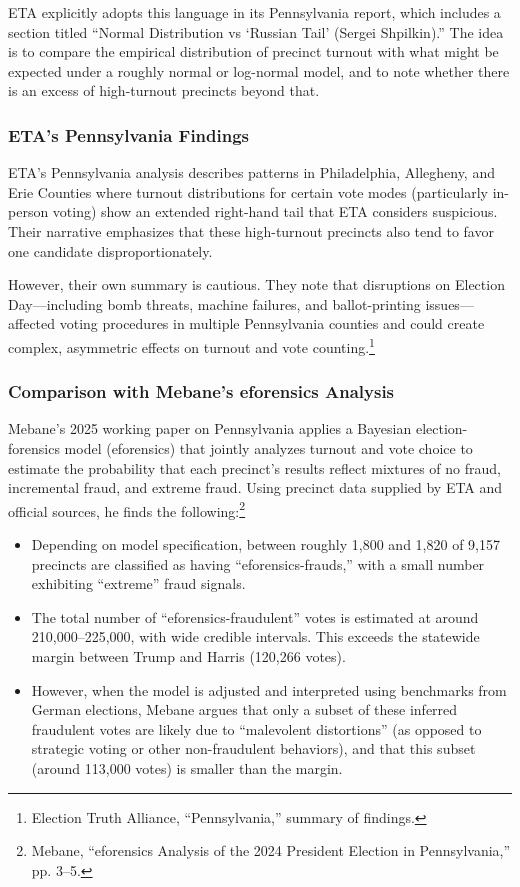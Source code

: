 \documentclass[12pt]{article}
\begin{document}
ETA explicitly adopts this language in its Pennsylvania report, which includes a section titled \enquote{Normal Distribution vs `Russian Tail' (Sergei Shpilkin).} The idea is to compare the empirical distribution of precinct turnout with what might be expected under a roughly normal or log-normal model, and to note whether there is an excess of high-turnout precincts beyond that.

\subsubsection{ETA's Pennsylvania Findings}

ETA's Pennsylvania analysis describes patterns in Philadelphia, Allegheny, and Erie Counties where turnout distributions for certain vote modes (particularly in-person voting) show an extended right-hand tail that ETA considers suspicious. Their narrative emphasizes that these high-turnout precincts also tend to favor one candidate disproportionately.

However, their own summary is cautious. They note that disruptions on Election Day---including bomb threats, machine failures, and ballot-printing issues---affected voting procedures in multiple Pennsylvania counties and could create complex, asymmetric effects on turnout and vote counting.\footnote{Election Truth Alliance, ``Pennsylvania,'' summary of findings.}

\subsubsection{Comparison with Mebane's eforensics Analysis}

Mebane's 2025 working paper on Pennsylvania applies a Bayesian election-forensics model (eforensics) that jointly analyzes turnout and vote choice to estimate the probability that each precinct's results reflect mixtures of no fraud, incremental fraud, and extreme fraud. Using precinct data supplied by ETA and official sources, he finds the following:\footnote{Mebane, ``eforensics Analysis of the 2024 President Election in Pennsylvania,'' pp. 3--5.}

\begin{itemize}
    \item Depending on model specification, between roughly 1,800 and 1,820 of 9,157 precincts are classified as having \enquote{eforensics-frauds,} with a small number exhibiting \enquote{extreme} fraud signals.
    \item The total number of \enquote{eforensics-fraudulent} votes is estimated at around 210,000--225,000, with wide credible intervals. This exceeds the statewide margin between Trump and Harris (120,266 votes).
    \item However, when the model is adjusted and interpreted using benchmarks from German elections, Mebane argues that only a subset of these inferred fraudulent votes are likely due to \enquote{malevolent distortions} (as opposed to strategic voting or other non-fraudulent behaviors), and that this subset (around 113,000 votes) is smaller than the margin.
\end{itemize}
\end{document}
